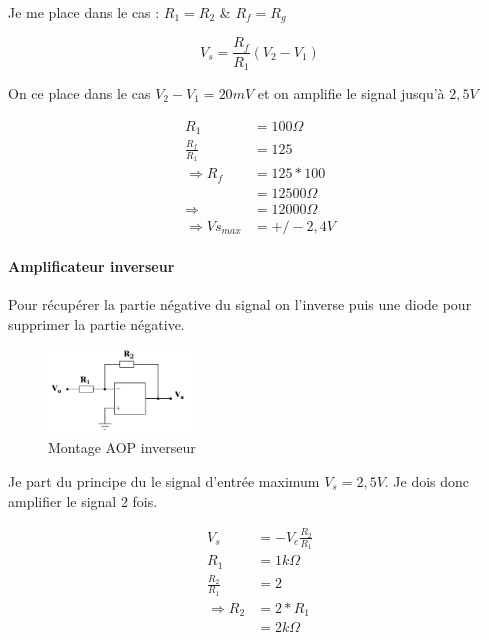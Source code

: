 \documentclass[11pt]{article}
\begin{document}
Je me place dans le cas : $R_{1} = R_{2}$ \&  $R_{f} = R_{g}$   

\begin{equation}
	V_{s} = \frac{R_{f}}{R_{1}}(V_{2}-V_{1})
\end{equation}

On ce place dans le cas $V_{2}-V_{1} = 20mV$ et on amplifie le signal jusqu'à $2,5V$
		
\begin{equation}
	 \begin{split}
		R_{1} &= 100 \Omega\\
		\frac{R_{f}}{R_{1}} &= 125\\
		\Rightarrow R_{f} &= 125*100\\
		&= 12500 \Omega\\
		\Rightarrow &= 12000 \Omega\\
		\Rightarrow Vs_{max} &= +/-2,4V 
	\end{split}
\end{equation}

\paragraph{Amplificateur inverseur}

Pour récupérer la partie négative du signal on l'inverse puis une diode pour supprimer la partie négative.

\begin{figure}[!h]
	\centering
	\includegraphics[width=150px]{AOP_inv.png}
	\caption{Montage AOP inverseur}
\end{figure}
\FloatBarrier

Je part du principe du le signal d'entrée maximum $V_{s} = 2,5V$. Je dois donc amplifier le signal 2 fois.

\begin{equation}
	 \begin{split}
		V_{s} &= - V_{e} \frac{R_{2}}{R_{1}}\\
		R_{1} &= 1k\Omega\\
		\frac{R_{2}}{R_{1}} &= 2\\
		\Rightarrow R_{2} &= 2 * R_{1}\\
		&= 2k\Omega
	\end{split}
\end{equation}
\end{document}
